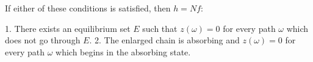 If either of these conditions is satisfied, then $h = Nf$:

1. There exists an equilibrium set $E$ such that $z(\omega) = 0$ for every path $\omega$ which does not go through $E$.
2. The enlarged chain is absorbing and $z(\omega) = 0$ for every path $\omega$ which begins in the absorbing state.

